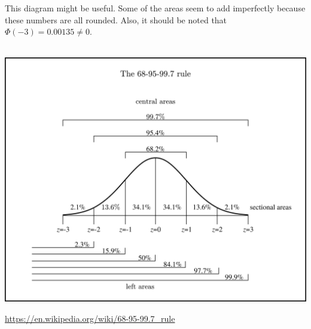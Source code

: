 \documentclass[12pt,letterpaper]{article}
\begin{document}
\newpage
This diagram might be useful. Some of the areas seem to add imperfectly because these numbers are all rounded. Also, it should be noted that $\Phi(-3) = 0.00135 \ne 0$.\\\\
\begin{center}
\includegraphics[scale=1]{toomuch.png}
\end{center}
\url{https://en.wikipedia.org/wiki/68-95-99.7_rule}
\end{document}
